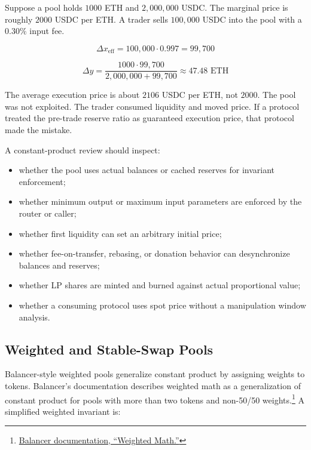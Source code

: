 \begin{workedexamplebox}
Suppose a pool holds \(1000\) ETH and \(2{,}000{,}000\) USDC. The marginal price is roughly \(2000\) USDC per ETH. A trader sells \(100{,}000\) USDC into the pool with a \(0.30\%\) input fee.

\[
    \Delta x_{\mathrm{eff}} = 100{,}000 \cdot 0.997 = 99{,}700
\]

\[
    \Delta y =
    \frac{1000 \cdot 99{,}700}{2{,}000{,}000 + 99{,}700}
    \approx 47.48 \text{ ETH}
\]

The average execution price is about \(2106\) USDC per ETH, not \(2000\). The pool was not exploited. The trader consumed liquidity and moved price. If a protocol treated the pre-trade reserve ratio as guaranteed execution price, that protocol made the mistake.
\end{workedexamplebox}

A constant-product review should inspect:

\begin{itemize}
\item whether the pool uses actual balances or cached reserves for invariant enforcement;
\item whether minimum output or maximum input parameters are enforced by the router or caller;
\item whether first liquidity can set an arbitrary initial price;
\item whether fee-on-transfer, rebasing, or donation behavior can desynchronize balances and reserves;
\item whether LP shares are minted and burned against actual proportional value;
\item whether a consuming protocol uses spot price without a manipulation window analysis.
\end{itemize}

\subsection{Weighted and Stable-Swap Pools}

Balancer-style weighted pools generalize constant product by assigning weights to tokens. Balancer's documentation describes weighted math as a generalization of constant product for pools with more than two tokens and non-50/50 weights.\footnote{\href{https://docs.balancer.fi/concepts/explore-available-balancer-pools/weighted-pool/weighted-math.html}{Balancer documentation, ``Weighted Math.''}} A simplified weighted invariant is:


